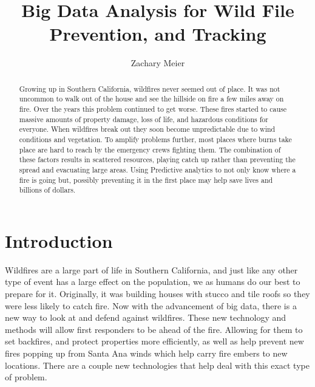 \documentclass[sigconf]{acmart}
\begin{document}
\title{Big Data Analysis for Wild File Prevention, and Tracking}
\author{Zachary Meier}
\renewcommand{\shortauthors}{Z. Meier et al.}

\begin{abstract}
Growing up in Southern California, wildfires never seemed out of place. It was not uncommon to walk out of the house and see the hillside on fire a few miles away on fire. Over the years this problem continued to get worse. These fires started to cause massive amounts of property damage, loss of life, and hazardous conditions for everyone.  When wildfires break out they soon become unpredictable due to wind conditions and vegetation.  To amplify problems further, most places where burns take place are hard to reach by the emergency crews fighting them.  The combination of these factors results in scattered resources, playing catch up rather than preventing the spread and evacuating large areas.  Using Predictive analytics to not only know where a fire is going but, possibly preventing it in the first place may help save lives and billions of dollars.
\end{abstract}


\maketitle

\section{Introduction}
Wildfires are a large part of life in Southern California, and just like any other type of event has a large effect on the population, we as humans do our best to prepare for it.   Originally, it was building houses with stucco and tile roofs so they were less likely to catch fire. Now with the advancement of big data, there is a new way to look at and defend against wildfires.  These new technology and methods will allow first responders to be ahead of the fire.  Allowing for them to set backfires, and protect properties more efficiently, as well as help prevent new fires popping up from Santa Ana winds which help carry fire embers to new locations. There are a couple new technologies that help deal with this exact type of problem.
\end{document}
